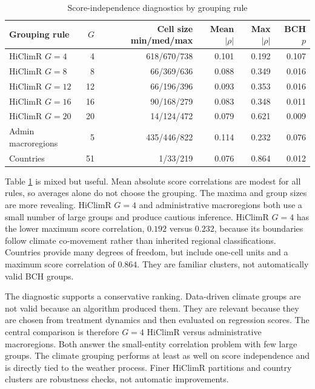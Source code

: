 \documentclass[
]{article}
\begin{document}
\begin{table}[H]
\centering
\caption{Score-independence diagnostics by grouping rule}
\label{tab:score-diagnostics}
\scriptsize
\begin{tabular}{lrrrrr}
\toprule
Grouping rule & \(G\) & Cell size min/med/max & Mean \(|\rho|\) & Max \(|\rho|\) & BCH \(p\)\\
\midrule
HiClimR \(G=4\)  & 4  & 618/670/738 & 0.101 & 0.192 & 0.107\\
HiClimR \(G=8\)  & 8  & 66/369/636  & 0.088 & 0.349 & 0.016\\
HiClimR \(G=12\) & 12 & 66/196/396  & 0.093 & 0.353 & 0.016\\
HiClimR \(G=16\) & 16 & 90/168/279  & 0.083 & 0.348 & 0.011\\
HiClimR \(G=20\) & 20 & 14/124/472  & 0.079 & 0.621 & 0.009\\
Admin macroregions & 5 & 435/446/822 & 0.114 & 0.232 & 0.076\\
Countries        & 51 & 1/33/219     & 0.076 & 0.864 & 0.012\\
\bottomrule
\end{tabular}
\end{table}

Table \ref{tab:score-diagnostics} is mixed but useful. Mean absolute
score correlations are modest for all rules, so averages alone do not
choose the grouping. The maxima and group sizes are more revealing.
HiClimR \(G=4\) and administrative macroregions both use a small number
of large groups and produce cautious inference. HiClimR \(G=4\) has the
lower maximum score correlation, \(0.192\) versus \(0.232\), because its
boundaries follow climate co-movement rather than inherited regional
classifications. Countries provide many degrees of freedom, but include
one-cell units and a maximum score correlation of \(0.864\). They are
familiar clusters, not automatically valid BCH groups.

The diagnostic supports a conservative ranking. Data-driven climate
groups are not valid because an algorithm produced them. They are
relevant because they are chosen from treatment dynamics and then
evaluated on regression scores. The central comparison is therefore
\(G=4\) HiClimR versus administrative macroregions. Both answer the
small-entity correlation problem with few large groups. The climate
grouping performs at least as well on score independence and is directly
tied to the weather process. Finer HiClimR partitions and country
clusters are robustness checks, not automatic improvements.
\end{document}
